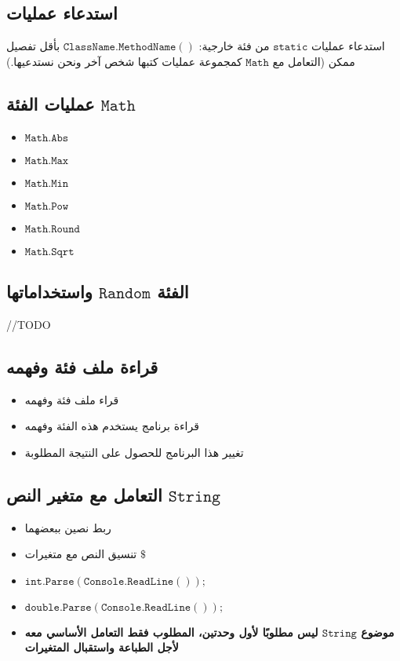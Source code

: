 \documentclass[12pt]{article}
\begin{document}
\subsection{استدعاء عمليات}

استدعاء عمليات $\mathtt{static}$ من فئة خارجية: $\mathtt{ClassName.MethodName()}$ بأقل تفصيل ممكن (التعامل مع $\mathtt{Math}$ كمجموعة عمليات كتبها شخص آخر ونحن نستدعيها.)

\subsection{عمليات الفئة $\mathtt{Math}$}
\begin{itemize}
    \item $\mathtt{Math.Abs}$
    \item $\mathtt{Math.Max}$
    \item $\mathtt{Math.Min}$
    \item $\mathtt{Math.Pow}$
    \item $\mathtt{Math.Round}$
    \item $\mathtt{Math.Sqrt}$
\end{itemize}

\subsection{الفئة $\mathtt{Random}$ واستخداماتها}

//TODO

\subsection{قراءة ملف فئة وفهمه}
\begin{itemize}
    \item قراء ملف فئة وفهمه
    \item قراءة برنامج يستخدم هذه الفئة وفهمه
    \item تغيير هذا البرنامج للحصول على النتيجة المطلوبة
\end{itemize}

\subsection{التعامل مع متغير النص $\mathtt{String}$}

\begin{itemize}
    \item ربط نصين ببعضهما
    \item تنسيق النص مع متغيرات $\mathtt{\$}$
    \item $\mathtt{int.Parse(Console.ReadLine());}$
    \item $\mathtt{double.Parse(Console.ReadLine());}$
    \item \textbf{موضوع $\mathtt{String}$ ليس مطلوبًا لأول وحدتين، المطلوب فقط التعامل الأساسي معه لأجل الطباعة واستقبال المتغيرات}
\end{itemize}
\end{document}
